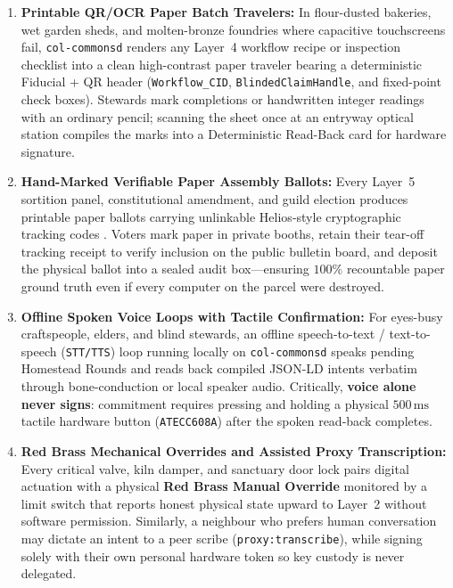 \begin{enumerate}
    \item \textbf{Printable QR/OCR Paper Batch Travelers:} In flour-dusted bakeries, wet garden sheds, and molten-bronze foundries where capacitive touchscreens fail, \texttt{col-commonsd} renders any Layer~4 workflow recipe or inspection checklist into a clean high-contrast paper traveler bearing a deterministic Fiducial + QR header (\texttt{Workflow\_CID}, \texttt{BlindedClaimHandle}, and fixed-point check boxes). Stewards mark completions or handwritten integer readings with an ordinary pencil; scanning the sheet once at an entryway optical station compiles the marks into a Deterministic Read-Back card for hardware signature.
    \item \textbf{Hand-Marked Verifiable Paper Assembly Ballots:} Every Layer~5 sortition panel, constitutional amendment, and guild election produces printable paper ballots carrying unlinkable Helios-style cryptographic tracking codes \parencite{adida2008helios,juels2005coercion}. Voters mark paper in private booths, retain their tear-off tracking receipt to verify inclusion on the public bulletin board, and deposit the physical ballot into a sealed audit box---ensuring $100\%$ recountable paper ground truth even if every computer on the parcel were destroyed.
    \item \textbf{Offline Spoken Voice Loops with Tactile Confirmation:} For eyes-busy craftspeople, elders, and blind stewards, an offline speech-to-text / text-to-speech (\texttt{STT/TTS}) loop running locally on \texttt{col-commonsd} speaks pending Homestead Rounds and reads back compiled JSON-LD intents verbatim through bone-conduction or local speaker audio. Critically, \textbf{voice alone never signs}: commitment requires pressing and holding a physical $500\,\mathrm{ms}$ tactile hardware button (\texttt{ATECC608A}) after the spoken read-back completes.
    \item \textbf{Red Brass Mechanical Overrides and Assisted Proxy Transcription:} Every critical valve, kiln damper, and sanctuary door lock pairs digital actuation with a physical \textbf{Red Brass Manual Override} monitored by a limit switch that reports honest physical state upward to Layer~2 without software permission. Similarly, a neighbour who prefers human conversation may dictate an intent to a peer scribe (\texttt{proxy:transcribe}), while signing solely with their own personal hardware token so key custody is never delegated.
\end{enumerate}

